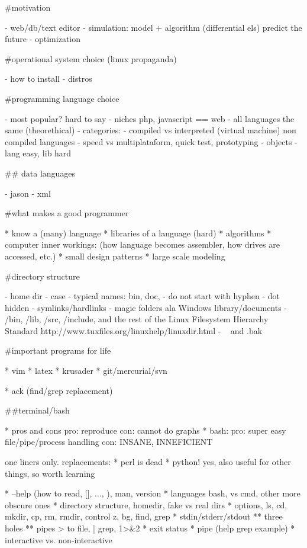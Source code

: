 #motivation

- web/db/text editor
- simulation: model + algorithm (differential els) predict the future
- optimization

#operational system choice (linux propaganda)

- how to install
- distros

#programming language choice

- most popular? hard to say
- niches php, javascript == web
- all languages the same (theorethical)
- categories:
  - compiled vs interpreted (virtual machine) non compiled languages
      - speed vs multiplataform, quick test, prototyping
  - objects
- lang easy, lib hard

## data languages

- jason
- xml

#what makes a good programmer

* know a (many) language
* libraries of a language (hard)
* algorithms
* computer inner workings: (how language becomes assembler, how drives are accessed, etc.)
* small design patterns
* large scale modeling

#directory structure

- home dir
- case
- typical names: bin, doc, 
- do not start with hyphen
- dot hidden
- symlinks/hardlinks
- magic folders ala Windows library/documents
- /bin, /lib, /src, /include, and the rest of the Linux Filesystem Hierarchy Standard
   http://www.tuxfiles.org/linuxhelp/linuxdir.html 
- ~ and .bak

#important programs for life

* vim
* latex
* krusader
* git/mercurial/svn

* ack (find/grep replacement)

##terminal/bash

* pros and cons
    pro: reproduce
    con: cannot do graphs
* bash:
    pro: super easy file/pipe/process handling
    con: INSANE, INNEFICIENT

    one liners only. replacements:
    * perl is dead
    * python! yes, also useful for other things, so worth learning

* --help (how to read, [], ..., ), man, version
* languages bash, vs cmd, other more obscure ones
* directory structure, homedir, fake vs real dirs
* options, ls, cd, mkdir, cp, rm, rmdir, control z, bg, find, grep
* stdin/stderr/stdout
** three holes
** pipes > to file, | grep, 1>&2
* exit status
* pipe (help grep example)
* interactive vs. non-interactive

